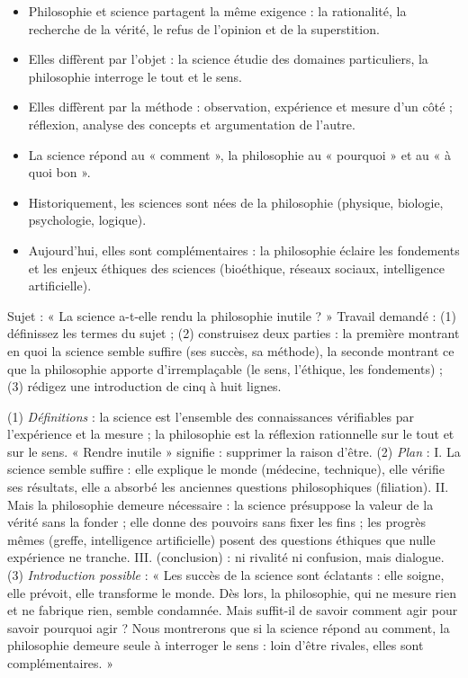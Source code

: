 \documentclass[11pt]{article}
\newcommand{\cle}[1]{{\popxbold\color{popdark}#1}}
\begin{document}
\begin{aretenir}
\begin{itemize}
\item Philosophie et science partagent la même exigence : la \cle{rationalité}, la recherche de la \cle{vérité}, le refus de l'opinion et de la superstition.
\item Elles diffèrent par l'\cle{objet} : la science étudie des domaines particuliers, la philosophie interroge le tout et le sens.
\item Elles diffèrent par la \cle{méthode} : observation, expérience et mesure d'un côté ; réflexion, analyse des concepts et argumentation de l'autre.
\item La science répond au « \cle{comment} », la philosophie au « \cle{pourquoi} » et au « \cle{à quoi bon} ».
\item Historiquement, les sciences sont \cle{nées de la philosophie} (physique, biologie, psychologie, logique).
\item Aujourd'hui, elles sont \cle{complémentaires} : la philosophie éclaire les fondements et les enjeux éthiques des sciences (bioéthique, réseaux sociaux, intelligence artificielle).
\end{itemize}
\end{aretenir}

\begin{exercice}
Sujet : « La science a-t-elle rendu la philosophie inutile ? »
Travail demandé : (1) définissez les termes du sujet ; (2) construisez deux parties : la première montrant en quoi la science semble suffire (ses succès, sa méthode), la seconde montrant ce que la philosophie apporte d'irremplaçable (le sens, l'éthique, les fondements) ; (3) rédigez une introduction de cinq à huit lignes.
\end{exercice}

\begin{corrige}
(1) \emph{Définitions} : la science est l'ensemble des connaissances vérifiables par l'expérience et la mesure ; la philosophie est la réflexion rationnelle sur le tout et sur le sens. « Rendre inutile » signifie : supprimer la raison d'être.
(2) \emph{Plan} : I. La science semble suffire : elle explique le monde (médecine, technique), elle vérifie ses résultats, elle a absorbé les anciennes questions philosophiques (filiation). II. Mais la philosophie demeure nécessaire : la science présuppose la valeur de la vérité sans la fonder ; elle donne des pouvoirs sans fixer les fins ; les progrès mêmes (greffe, intelligence artificielle) posent des questions éthiques que nulle expérience ne tranche. III. (conclusion) : ni rivalité ni confusion, mais dialogue.
(3) \emph{Introduction possible} : « Les succès de la science sont éclatants : elle soigne, elle prévoit, elle transforme le monde. Dès lors, la philosophie, qui ne mesure rien et ne fabrique rien, semble condamnée. Mais suffit-il de savoir comment agir pour savoir pourquoi agir ? Nous montrerons que si la science répond au comment, la philosophie demeure seule à interroger le sens : loin d'être rivales, elles sont complémentaires. »
\end{corrige}
\end{document}
